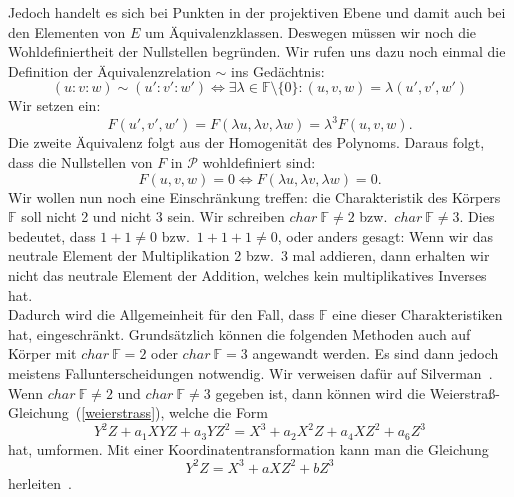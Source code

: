 \documentclass[hidelinks]{article}
\theoremstyle{plain}
\theoremstyle{definition}
\theoremstyle{rem}
\newcommand{\fnz}{\mathbb{F}\setminus\{0\}}
\begin{document}
\begin{sloppypar}
Jedoch handelt es sich bei Punkten in der projektiven Ebene und damit auch bei den Elementen von $E$ um Äquivalenzklassen. Deswegen müssen wir noch die Wohldefiniertheit der Nullstellen begründen. 
Wir rufen uns dazu noch einmal die Definition der Äquivalenzrelation $\sim$ ins Gedächtnis: 
\begin{equation*}
	(u:v:w) \sim (u':v':w') \Leftrightarrow \exists \lambda \in \fnz: (u,v,w) = \lambda (u',v',w')
\end{equation*}
Wir setzen ein:
\begin{equation*}
    F(u',v',w') = F(\lambda u, \lambda v, \lambda w) = \lambda^3 F(u,v,w).
\end{equation*}
Die zweite Äquivalenz folgt aus der Homogenität des Polynoms. Daraus folgt, dass die Nullstellen von $F$ in $\mathcal{P}$ wohldefiniert sind:
\begin{equation*}
    F(u,v,w) = 0 \Leftrightarrow F(\lambda u, \lambda v, \lambda w) = 0.
\end{equation*}
Wir wollen nun noch eine Einschränkung treffen: die Charakteristik des Körpers $\mathbb{F}$ soll nicht 2 und nicht 3 sein. Wir schreiben $char \: \mathbb{F} \neq 2$ bzw.\ $char \: \mathbb{F} \neq 3$. 
Dies bedeutet, dass $1 + 1 \neq 0$ bzw.\ $1 + 1 + 1 \neq 0$, oder anders gesagt: Wenn wir das neutrale Element der Multiplikation 2 bzw.\ 3 mal addieren, dann erhalten wir nicht das neutrale Element der Addition, welches kein multiplikatives Inverses hat. \\
Dadurch wird die Allgemeinheit für den Fall, dass $\mathbb{F}$ eine dieser Charakteristiken hat, eingeschränkt. Grundsätzlich können die folgenden Methoden auch auf Körper mit $char \: \mathbb{F}=2$ oder $char \: \mathbb{F}=3$ angewandt werden. Es sind dann jedoch meistens Fallunterscheidungen notwendig. Wir verweisen dafür auf Silverman~\cite[Seite~44]{silverman}.  \\ \newline
Wenn $char \: \mathbb{F} \neq 2$ und $char \: \mathbb{F} \neq 3$ gegeben ist, dann können wird die Weierstraß-Gleichung~(\ref{weierstrass}), welche die Form
\begin{equation*}
    Y^2Z + a_1XYZ + a_3YZ^2 = X^3 + a_2X^2Z + a_4XZ^2 + a_6Z^3
\end{equation*}
hat, umformen. Mit einer Koordinatentransformation kann man die Gleichung
\begin{equation} \label{reduziert-weierstrass}
    Y^2Z = X^3 + aXZ^2 + bZ^3
\end{equation}
herleiten~\cite[Seite~50]{milne2006}.

\end{sloppypar}
\end{document}

